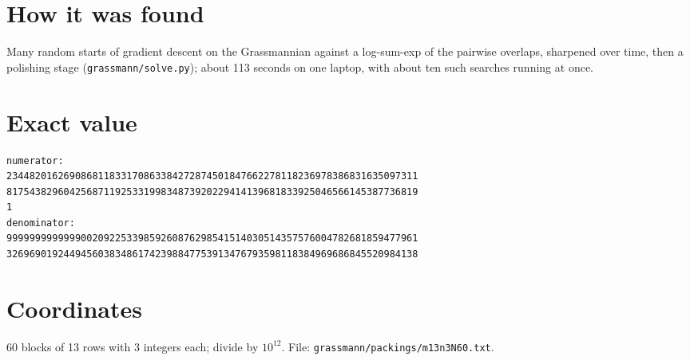 \documentclass[11pt,a4paper]{article}
\begin{document}
\section{How it was found}
Many random starts of gradient descent on the Grassmannian against a log-sum-exp of the pairwise overlaps, sharpened over time, then a polishing stage (\texttt{grassmann/solve.py}); about 113 seconds on one laptop, with about ten such searches running at once.


\appendix
\section{Exact value}
{\small
\begin{verbatim}
numerator:
234482016269086811833170863384272874501847662278118236978386831635097311
817543829604256871192533199834873920229414139681833925046566145387736819
1
denominator:
999999999999900209225339859260876298541514030514357576004782681859477961
326969019244945603834861742398847753913476793598118384969686845520984138
\end{verbatim}}

\section{Coordinates}
60 blocks of 13 rows with 3 integers each; divide by $10^{12}$. File: \texttt{grassmann/packings/m13n3N60.txt}.
{\tiny
\begin{multicols}{3}
\end{multicols}}
\end{document}
